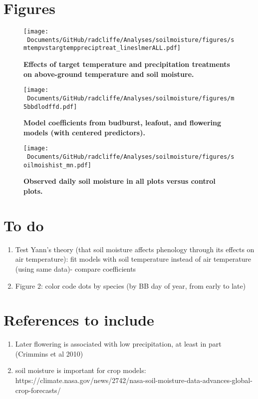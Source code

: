 \documentclass{article}
\begin{document}
\clearpage
\section* {Figures}
\clearpage
 \begin{figure}[h]
\centering
 \texttt{[image: ~Documents/GitHub/radcliffe/Analyses/soilmoisture/figures/smtempvstargtemppreciptreat\_lineslmerALL.pdf]}
 \caption{\textbf{Effects of target temperature and precipitation treatments on above-ground temperature and soil moisture.}} 
 \label{fig:soilmois}
 \end{figure}

\begin{figure}[h]
\centering
 \texttt{[image: ~Documents/GitHub/radcliffe/Analyses/soilmoisture/figures/m5bbdlodffd.pdf]}
 \caption{\textbf{Model coefficients from budburst, leafout, and flowering models (with centered predictors).}} 
 \label{fig:bb}
 \end{figure}

\begin{figure}[h]
\centering
 \texttt{[image: ~Documents/GitHub/radcliffe/Analyses/soilmoisture/figures/soilmoishist\_mn.pdf]}
 \caption{\textbf{Observed daily soil moisture in all plots versus control plots.}} 
 \label{fig:sm}
 \end{figure}

\section* {To do}
\begin{enumerate}
\item Test Yann's theory (that soil moisture affects phenology through its effects on air temperature): fit models with soil temperature instead of air temperature (using same data)- compare coefficients

\item Figure 2: color code dots by species (by BB day of year, from early to late)
\end{enumerate}
\section*{References to include}
\begin{enumerate}
\item Later flowering is  associated with low precipitation, at least in part (Crimmins et al 2010)
\item soil moisture is important for crop models: https://climate.nasa.gov/news/2742/nasa-soil-moisture-data-advances-global-crop-forecasts/


\end{enumerate}
\end{document}
